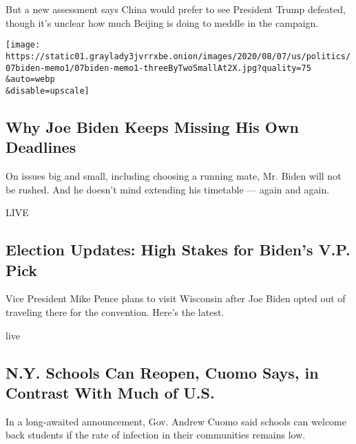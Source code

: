 But a new assessment says China would prefer to see President Trump
defeated, though it's unclear how much Beijing is doing to meddle in the
campaign.

\href{/2020/08/07/us/politics/joe-biden-vice-presidential-search.html}{}

\texttt{[image: https://static01.graylady3jvrrxbe.onion/images/2020/08/07/us/politics/07biden-memo1/07biden-memo1-threeByTwoSmallAt2X.jpg?quality=75\\\&auto=webp\\\&disable=upscale]}

\href{/2020/08/07/us/politics/joe-biden-vice-presidential-search.html}{}

\hypertarget{why-joe-biden-keeps-missing-his-own-deadlines}{%
\subsection{Why Joe Biden Keeps Missing His Own
Deadlines}\label{why-joe-biden-keeps-missing-his-own-deadlines}}

On issues big and small, including choosing a running mate, Mr. Biden
will not be rushed. And he doesn't mind extending his timetable ---
again and again.

\href{/2020/08/07/us/elections/trump-biden.html}{}

LIVE

\hypertarget{election-updates-high-stakes-for-bidens-vp-pick}{%
\subsection{Election Updates: High Stakes for Biden's V.P.
Pick}\label{election-updates-high-stakes-for-bidens-vp-pick}}

Vice President Mike Pence plans to visit Wisconsin after Joe Biden opted
out of traveling there for the convention. Here's the latest.

live

\href{/2020/08/07/nyregion/cuomo-schools-reopening.html}{}

\hypertarget{ny-schools-can-reopen-cuomo-says-in-contrast-with-much-of-us}{%
\subsection{N.Y. Schools Can Reopen, Cuomo Says, in Contrast With Much
of
U.S.}\label{ny-schools-can-reopen-cuomo-says-in-contrast-with-much-of-us}}

In a long-awaited announcement, Gov. Andrew Cuomo said schools can
welcome back students if the rate of infection in their communities
remains low.

